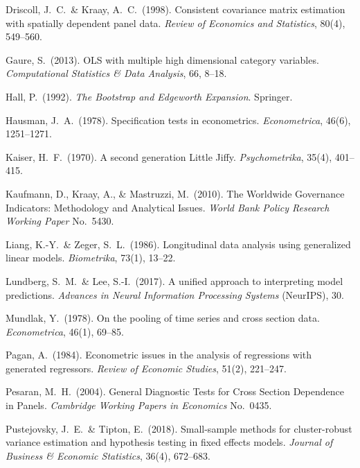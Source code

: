 \documentclass[12pt, a4paper]{article}
\theoremstyle{definition}
\begin{document}
\begin{enumerate}[label={[\arabic*]}, leftmargin=*, itemsep=4pt]
\item Driscoll, J.~C.\ \& Kraay, A.~C.\ (1998). Consistent covariance matrix estimation with spatially dependent panel data. \textit{Review of Economics and Statistics}, 80(4), 549--560.

\item Gaure, S.\ (2013). OLS with multiple high dimensional category variables. \textit{Computational Statistics \& Data Analysis}, 66, 8--18.

\item Hall, P.\ (1992). \textit{The Bootstrap and Edgeworth Expansion}. Springer.

\item Hausman, J.~A.\ (1978). Specification tests in econometrics. \textit{Econometrica}, 46(6), 1251--1271.

\item Kaiser, H.~F.\ (1970). A second generation Little Jiffy. \textit{Psychometrika}, 35(4), 401--415.

\item Kaufmann, D., Kraay, A., \& Mastruzzi, M.\ (2010). The Worldwide Governance Indicators: Methodology and Analytical Issues. \textit{World Bank Policy Research Working Paper} No.~5430.

\item Liang, K.-Y.\ \& Zeger, S.~L.\ (1986). Longitudinal data analysis using generalized linear models. \textit{Biometrika}, 73(1), 13--22.

\item Lundberg, S.~M.\ \& Lee, S.-I.\ (2017). A unified approach to interpreting model predictions. \textit{Advances in Neural Information Processing Systems} (NeurIPS), 30.

\item Mundlak, Y.\ (1978). On the pooling of time series and cross section data. \textit{Econometrica}, 46(1), 69--85.

\item Pagan, A.\ (1984). Econometric issues in the analysis of regressions with generated regressors. \textit{Review of Economic Studies}, 51(2), 221--247.

\item Pesaran, M.~H.\ (2004). General Diagnostic Tests for Cross Section Dependence in Panels. \textit{Cambridge Working Papers in Economics} No.~0435.

\item Pustejovsky, J.~E.\ \& Tipton, E.\ (2018). Small-sample methods for cluster-robust variance estimation and hypothesis testing in fixed effects models. \textit{Journal of Business \& Economic Statistics}, 36(4), 672--683.


\end{enumerate}
\end{document}

